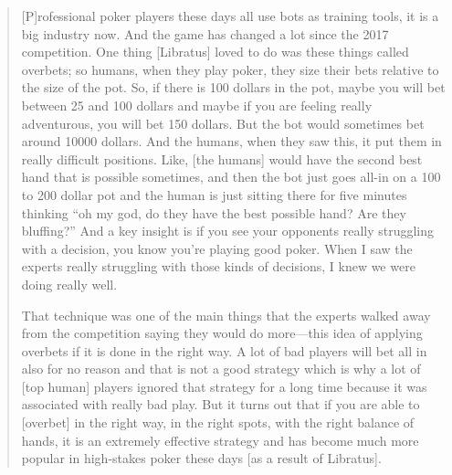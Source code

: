 \begin{quote}
[P]rofessional poker players these days all use bots as training tools, it is a big industry now. And the game has changed a lot since the 2017 competition. One thing [Libratus] loved to do was these things called overbets; so humans, when they play poker, they size their bets relative to the size of the pot. So, if there is 100 dollars in the pot, maybe you will bet between 25 and 100 dollars and maybe if you are feeling really adventurous, you will bet 150 dollars. But the bot would sometimes bet around 10000 dollars. And the humans, when they saw this, it put them in really difficult positions. Like, [the humans] would have the second best hand that is possible sometimes, and then the bot just goes all-in on a 100 to 200 dollar pot and the human is just sitting there for five minutes thinking ``oh my god, do they have the best possible hand? Are they bluffing?'' And a key insight is if you see your opponents really struggling with a decision, you know you're playing good poker.
When I saw the experts really struggling with those kinds of decisions, I knew we were doing really well.

That technique was one of the main things that the experts walked away from the competition saying they would do more---this idea of applying overbets if it is done in the right way. A lot of bad players will bet all in also for no reason and that is not a good strategy which is why a lot of [top human] players ignored that strategy for a long time because it was associated with really bad play. But it turns out that if you are able to [overbet] in the right way, in the right spots, with the right balance of hands, it is an extremely effective strategy and has become much more popular in high-stakes poker these days [as a result of Libratus].
\end{quote}
